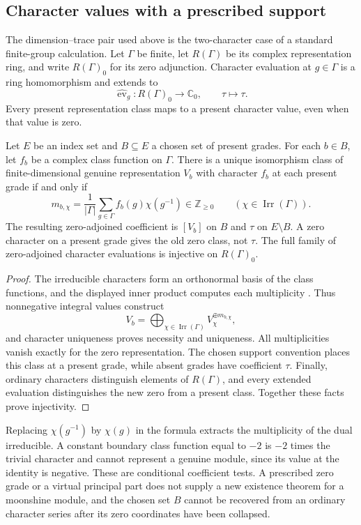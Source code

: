 \subsection{Character values with a prescribed support}\label{sec:character-support}
The dimension--trace pair used above is the two-character case of a standard finite-group calculation. Let $\Gamma$ be finite, let $R(\Gamma)$ be its complex representation ring, and write $R(\Gamma)_0$ for its zero adjunction. Character evaluation at $g\in\Gamma$ is a ring homomorphism and extends to
\[
 \widehat{\operatorname{ev}}_g:R(\Gamma)_0\longrightarrow\mathbb C_0,
 \qquad \tau\longmapsto\tau.
\]
Every present representation class maps to a present character value, even when that value is zero.

\begin{proposition}\label{prop:character-support}
Let $E$ be an index set and $B\subseteq E$ a chosen set of present grades. For each $b\in B$, let $f_b$ be a complex class function on $\Gamma$. There is a unique isomorphism class of finite-dimensional genuine representation $V_b$ with character $f_b$ at each present grade if and only if
\[
 m_{b,\chi}=\frac1{|\Gamma|}\sum_{g\in\Gamma}f_b(g)\chi(g^{-1})
 \in\mathbb Z_{\ge0}
 \qquad(\chi\in\operatorname{Irr}(\Gamma)).
\]
The resulting zero-adjoined coefficient is $[V_b]$ on $B$ and $\tau$ on $E\setminus B$. A zero character on a present grade gives the old zero class, not $\tau$. The full family of zero-adjoined character evaluations is injective on $R(\Gamma)_0$.
\end{proposition}
\begin{proof}
The irreducible characters form an orthonormal basis of the class functions, and the displayed inner product computes each multiplicity \citep[\S2.3, Theorem~4 and Corollary~2, p.~16; \S2.5, Theorem~6, p.~19]{SerreCharacters}. Thus nonnegative integral values construct
\[
 V_b=\bigoplus_{\chi\in\operatorname{Irr}(\Gamma)}
 V_\chi^{\oplus m_{b,\chi}},
\]
and character uniqueness proves necessity and uniqueness. All multiplicities vanish exactly for the zero representation. The chosen support convention places this class at a present grade, while absent grades have coefficient $\tau$. Finally, ordinary characters distinguish elements of $R(\Gamma)$, and every extended evaluation distinguishes the new zero from a present class. Together these facts prove injectivity.
\end{proof}

Replacing $\chi(g^{-1})$ by $\chi(g)$ in the formula extracts the multiplicity of the dual irreducible. A constant boundary class function equal to $-2$ is $-2$ times the trivial character and cannot represent a genuine module, since its value at the identity is negative. These are conditional coefficient tests. A prescribed zero grade or a virtual principal part does not supply a new existence theorem for a moonshine module, and the chosen set $B$ cannot be recovered from an ordinary character series after its zero coordinates have been collapsed.
